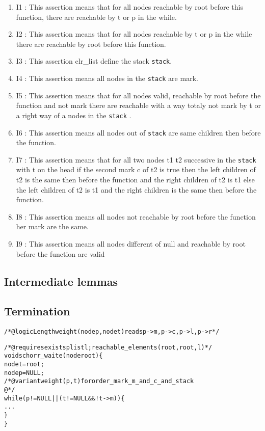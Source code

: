 \begin {enumerate}
\item {I1} : This assertion means that for all nodes reachable by root
  before this function, there are reachable by t or p in the while.
\item {I2} : This assertion means that for all nodes reachable by t or
  p in the while there are reachable by root before this function.
\item {I3} : This assertion clr\_list define the stack \texttt{stack}.
\item {I4} : This assertion means all nodes in the
  \texttt{stack} are mark.
\item {I5} : This assertion means that for all nodes valid, reachable by root
  before the function and not mark there are reachable with a way
  totaly not mark by t or a right way of a nodes in the \texttt{stack} .
\item {I6} : This assertion means all nodes out of \texttt{stack} are
  same children then before the function. 
\item {I7} : This assertion means that for all two nodes t1 t2 successive in
  the \texttt{stack} with t on the head if the second mark c of t2 is
  true then the left children of t2 is the same then before the
  function and the right children of t2 is t1 else the left children
  of t2 is t1 and the right children  is the same then before the
  function.
\item {I8} : This assertion means all nodes not reachable by root before the
  function her mark are the same.
\item {I9} :  This assertion means all nodes different of null and
  reachable by root before the function are valid
\end{enumerate}
\subsection{Intermediate lemmas}

\subsection{Termination}

\begin{alltt}
/*@ logic Length weight(node p , node t) reads p->m,p->c,p->l,p->r*/

/*@ requires \bs{}exists plist l; reachable_elements(root,root,l) */
void schorr_waite(node root) \{
  node t = root;
  node p = NULL;
  /*@variant weight(p,t) for order_mark_m_and_c_and_stack 
    @*/
  while (p != NULL || (t != NULL && ! t->m)) \{
   ...
  \}
\}
\end{alltt}

